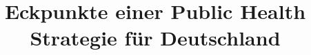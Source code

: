 \documentclass[11pt]{book}
\title{Eckpunkte einer Public Health Strategie für Deutschland}
\author{}
\begin{document}
\maketitle
\def\title#1{\chapter{#1}}
\tableofcontents

        
        
        
        
        
        
        
        
        
        
        
        
        
        
        
        
        
        
        
        
        
        
        
        
        
        
        
        
        
        
        
        
        
        
\end{document}
